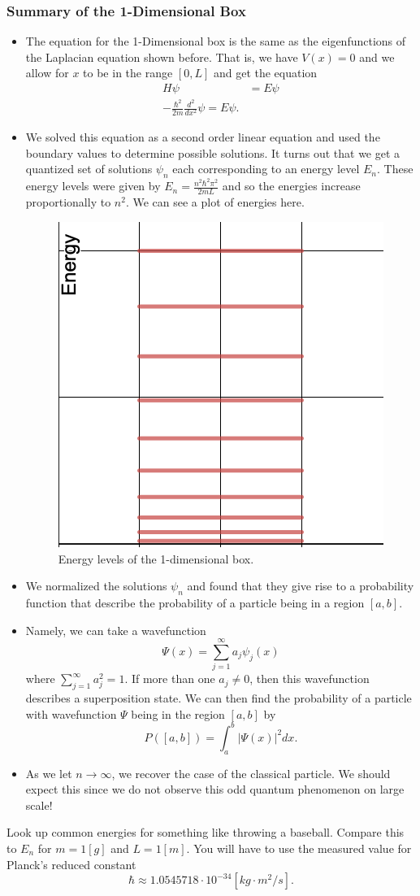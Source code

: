\subsubsection{Summary of the 1-Dimensional Box}
\begin{itemize}
    \item The equation for the 1-Dimensional box is the same as the eigenfunctions of the Laplacian equation shown before. That is, we have $V(x)=0$ and we allow for $x$ to be in the range $[0,L]$ and get the equation
    \begin{align*}
        H\psi &= E \psi\\
        -\frac{\hbar^2}{2m}\frac{d^2}{dx^2}\psi = E \psi.
    \end{align*}
    \item We solved this equation as a second order linear equation and used the boundary values to determine possible solutions.  It turns out that we get a quantized set of solutions $\psi_n$ each corresponding to an energy level $E_n$. These energy levels were given by $E_n = \frac{n^2 \hbar^2 \pi^2}{2mL}$ and so the energies increase proportionally to $n^2$. We can see a plot of energies here.
    \begin{figure}[H]
        \centering
        \includegraphics[width=.5\textwidth]{Figures_Part_2/energy_levels.png}
        \caption{Energy levels of the 1-dimensional box.}
    \end{figure}
    \item We normalized the solutions $\psi_n$ and found that they give rise to a probability function that describe the probability of a particle being in a region $[a,b]$. 
    \item Namely, we can take a wavefunction
    \[
    \Psi(x)=\sum_{j=1}^\infty a_j \psi_j(x)
    \]
    where $\sum_{j=1}^\infty a_j^2 = 1$. If more than one $a_j\neq 0$, then this wavefunction describes a superposition state. We can then find the probability of a particle with wavefunction $\Psi$ being in the region $[a,b]$ by
    \[
    P([a,b])=\int_a^b |\Psi(x)|^2dx.
    \]
    \item As we let $n\to \infty$, we recover the case of the classical particle.  We should expect this since we do not observe this odd quantum phenomenon on large scale!
\end{itemize}

\begin{exercise}
Look up common energies for something like throwing a baseball. Compare this to $E_n$ for $m=1[g]$ and $L=1[m]$. You will have to use the measured value for Planck's reduced constant
\[
\hbar \approx 1.0545718\cdot 10^{-34}[kg \cdot m^2 /s].
\]
\end{exercise}

